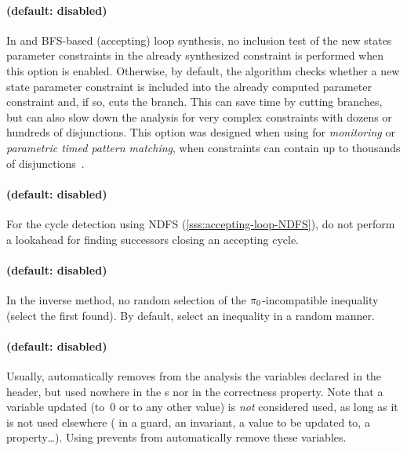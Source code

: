 \paragraph{ (default: disabled)}
In \EFsynth{} and BFS-based (accepting) loop synthesis, no inclusion test of the new states parameter constraints in the already synthesized constraint is performed when this option is enabled.
Otherwise, by default, the algorithm checks whether a new state parameter constraint is included into the already computed parameter constraint and, if so, cuts the branch.
This can save time by cutting branches, but can also slow down the analysis for very complex constraints with dozens or hundreds of disjunctions.
This option was designed when using \imitator{} for \emph{monitoring} or \emph{parametric timed pattern matching}, when constraints can contain up to thousands of disjunctions~\cite{AHW18}.


\paragraph{ (default: disabled)}
For the cycle detection using NDFS (\cref{sss:accepting-loop-NDFS}),
do not perform a lookahead for finding successors
closing an accepting cycle.


\paragraph{ (default: disabled)}
In the inverse method, no random selection of the $\pi_0$-incompatible inequality (select the first found).
By default, select an inequality in a random manner.



\paragraph{ (default: disabled)}
Usually, \imitator{} automatically removes from the analysis the variables declared in the header, but used nowhere in the \IPTA{}s nor in the correctness property.
Note that a variable updated (to~0 or to any other value) is \emph{not} considered used, as long as it is not used elsewhere (\ie{} in a guard, an invariant, a value to be updated to, a property…).
Using  prevents \imitator{} from automatically remove these variables.


